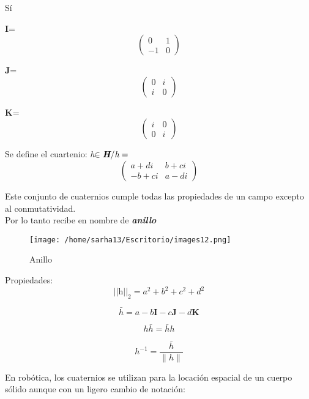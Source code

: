 \documentclass[letterpaper, openright, 12pt, spanish]{report}
\begin{document}
S\'i

\textbf{I}= \[\left(
\begin{array}{lcr}
0 &1\\
-1 &0
\end{array}
\right)
\]

\textbf{J}= \[\left(\begin{array}{lcr}
0 &i\\
i &0
\end{array}
\right)
\]

\textbf{K}= \[
\left(\begin{array}{lcr}
i &0\\
0 &i
\end{array}
\right)
\]

Se define el cuartenio: \textit{h}$\in\textit{\textbf{H}}/\textit{h}=$
\[
 \left(\begin{array}{lcr}
 a+di &b+ci\\
 -b+ci &a-di
 \end{array}
 \right)
 \]
 
	Este conjunto de cuaternios cumple todas las propiedades de un campo excepto al conmutatividad.\\
Por lo tanto recibe en nombre de \textit{\textbf{anillo}}\\

\begin{figure}[htp]
\centering
\texttt{[image: /home/sarha13/Escritorio/images12.png]}
\caption{Anillo}
\label{Figura 3.}
\end{figure}

Propiedades:\\

\begin{displaymath}
||\textit{h}||_2=a^2+b^2+c^2+d^2
\end{displaymath}

\begin{displaymath}
\bar{h}=a-b\textbf{I}-c\textbf{J}-d\textbf{K}
\end{displaymath}

\begin{displaymath}
h\bar{h}=\bar{h}h
\end{displaymath}

\begin{displaymath}
h^{-1}=\frac{\bar{h}}{\parallel{h}\parallel}
 \end{displaymath}

 En rob\'otica, los cuaternios se utilizan para la locaci\'on espacial de un cuerpo s\'olido aunque con un ligero cambio de notaci\'on:\\
\end{document}
